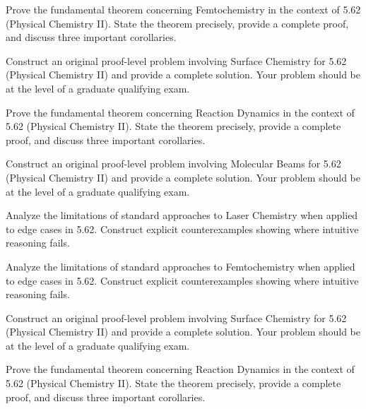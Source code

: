 \documentclass[12pt,a4paper]{exam}
\begin{document}
\begin{questions}
\vspace{0.3cm}

\question[4]
Prove the fundamental theorem concerning Femtochemistry in the context of 5.62 (Physical Chemistry II). State the theorem precisely, provide a complete proof, and discuss three important corollaries.

\vspace{0.3cm}

\question[4]
Construct an original proof-level problem involving Surface Chemistry for 5.62 (Physical Chemistry II) and provide a complete solution. Your problem should be at the level of a graduate qualifying exam.

\vspace{0.3cm}

\question[2]
Prove the fundamental theorem concerning Reaction Dynamics in the context of 5.62 (Physical Chemistry II). State the theorem precisely, provide a complete proof, and discuss three important corollaries.

\vspace{0.3cm}

\question[4]
Construct an original proof-level problem involving Molecular Beams for 5.62 (Physical Chemistry II) and provide a complete solution. Your problem should be at the level of a graduate qualifying exam.

\vspace{0.3cm}

\question[5]
Analyze the limitations of standard approaches to Laser Chemistry when applied to edge cases in 5.62. Construct explicit counterexamples showing where intuitive reasoning fails.

\vspace{0.3cm}

\question[2]
Analyze the limitations of standard approaches to Femtochemistry when applied to edge cases in 5.62. Construct explicit counterexamples showing where intuitive reasoning fails.

\vspace{0.3cm}

\question[2]
Construct an original proof-level problem involving Surface Chemistry for 5.62 (Physical Chemistry II) and provide a complete solution. Your problem should be at the level of a graduate qualifying exam.

\vspace{0.3cm}

\question[3]
Prove the fundamental theorem concerning Reaction Dynamics in the context of 5.62 (Physical Chemistry II). State the theorem precisely, provide a complete proof, and discuss three important corollaries.


\end{questions}
\end{document}
